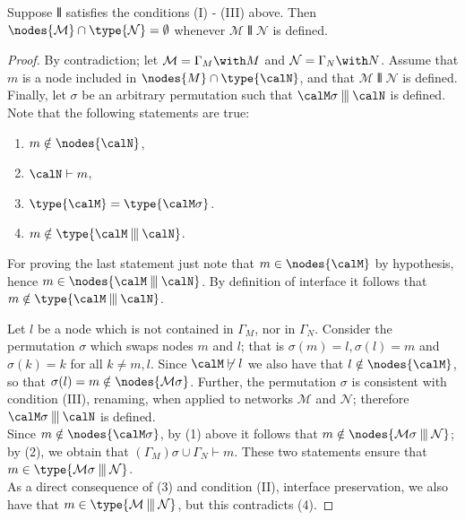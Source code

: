 \documentclass{LMCS}
\begin{document}
\begin{prop}\label{prop:I2III}
Suppose $\interleave$ satisfies the conditions (I) - (III) above. Then 
  $\nodes{\mathcal M} \cap \type{{\mathcal N}} = \emptyset$
  whenever  ${\mathcal  M} \interleave {\mathcal N}$ is defined. 

\end{prop}
\begin{proof}
By contradiction; let ${\mathcal M} = \Gamma_{M} \with M$ and 
${\mathcal N} = \Gamma_{N} \with N$. Assume that $m$ is a node included in 
$\nodes{M} \cap \type{\calN}$, and that 
${\mathcal M} \interleave \mathcal{N}$ is defined. 
Finally, let $\sigma$ be an arbitrary permutation such that 
$\calM\sigma \interleave \calN$ is defined. 
Note that the following statements are true: 
\begin{enumerate}
\item $m \notin \nodes{\calN}$,
\item $\calN \vdash m$,
\item $\type{\calM} = \type{\calM \sigma}$.
\item $m \notin \type{\calM \interleave \calN}$.
\end{enumerate}
\noindent For proving the last statement just note that 
$m \in \nodes{\calM}$ by hypothesis, hence 
$m \in \nodes{\calM \interleave \calN}$. 
By definition of interface it follows that 
$m \notin \type{\calM \interleave \calN}$.

Let $l$ be a node which is not contained in $\Gamma_M$, nor in $\Gamma_N$. 
Consider the permutation $\sigma$ which swaps nodes $m$ and $l$; that is 
$\sigma(m) = l, \sigma(l) = m$ and $\sigma(k) = k$ for all $k\neq m,l$. 
Since $\calM \not\vdash l$ we also have that $l \notin \nodes{\calM}$, 
so that $\sigma(l)= m \notin \nodes{{\mathcal M}\sigma}$.
Further, the permutation $\sigma$ is consistent with condition (III), renaming, when 
applied to networks $\mathcal M$ and $\mathcal N$; 
therefore ${\calM}\sigma \interleave \calN$ is 
defined.\\ 

Since $m \notin \nodes{\calM\sigma}$, by (1) above it follows 
that $m \notin \nodes{{\mathcal M\sigma}\interleave {\mathcal N}}$;  
by (2), we obtain that $(\Gamma_M)\sigma \cup \Gamma_N \vdash m$. These two statements ensure 
that $m \in \type{{\mathcal M}\sigma \interleave {\mathcal{N}}}$.\\
As a direct consequence of (3) and condition (II), interface preservation, we 
also have that $m \in \type{{\mathcal{M}} \interleave {\mathcal{N}}}$, 
but this contradicts (4).
\end{proof}
\end{document}
